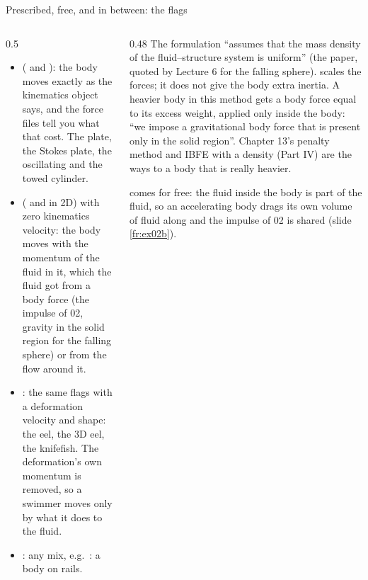 \documentclass[aspectratio=169,11pt]{beamer}
\begin{document}
\begin{frame}{Prescribed, free, and in between: the flags}
\label{fr:free}
\begin{columns}[T,onlytextwidth]
\begin{column}{0.5\textwidth}
\footnotesize
\begin{itemize}
  \item {} ( and ): the body moves exactly as the kinematics object says, and the force files tell you what that cost. The plate, the Stokes plate, the oscillating and the towed cylinder.
  \item {} ( and  in 2D) with zero kinematics velocity: the body moves with the momentum of the fluid in it, which the fluid got from a body force (the impulse of 02, gravity in the solid region for the falling sphere) or from the flow around it.
  \item {}: the same flags with a deformation velocity and shape: the eel, the 3D eel, the knifefish. The deformation's own momentum is removed, so a swimmer moves only by what it does to the fluid.
  \item {}: any mix, e.g.\ : a body on rails.
\end{itemize}
\end{column}
\begin{column}{0.48\textwidth}
\footnotesize {} The formulation ``assumes that the mass density of the fluid--structure system is uniform'' (the paper, quoted by Lecture 6 for the falling sphere).  scales the forces; it does not give the body extra inertia. A heavier body in this method gets a body force equal to its excess weight, applied only inside the body: ``we impose a gravitational body force that is present only in the solid region''. Chapter 13's penalty method and IBFE with a density (Part IV) are the ways to a body that is really heavier.
\vspace{1mm}

\footnotesize {} comes for free: the fluid inside the body is part of the fluid, so an accelerating body drags its own volume of fluid along and the impulse of 02 is shared (slide \ref{fr:ex02b}).
\end{column}
\end{columns}
\end{frame}
\end{document}
